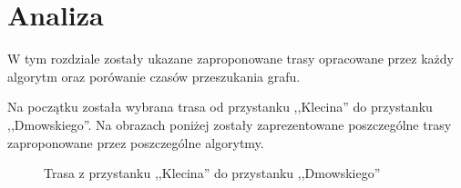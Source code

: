 \documentclass[12pt, polish]{article}
\begin{document}
\section{Analiza}
W tym rozdziale zostały ukazane zaproponowane trasy opracowane przez każdy algorytm oraz porówanie czasów przeszukania grafu.

Na początku została wybrana trasa od przystanku ,,Klecina'' do przystanku ,,Dmowskiego''. Na obrazach poniżej zostały zaprezentowane poszczególne trasy zaproponowane przez poszczególne algorytmy.


\begin{figure}[ht]
	\centering
	\quad
	\quad
	\quad
	\caption{Trasa z przystanku ,,Klecina'' do przystanku ,,Dmowskiego''}
\end{figure}	
\end{document}
